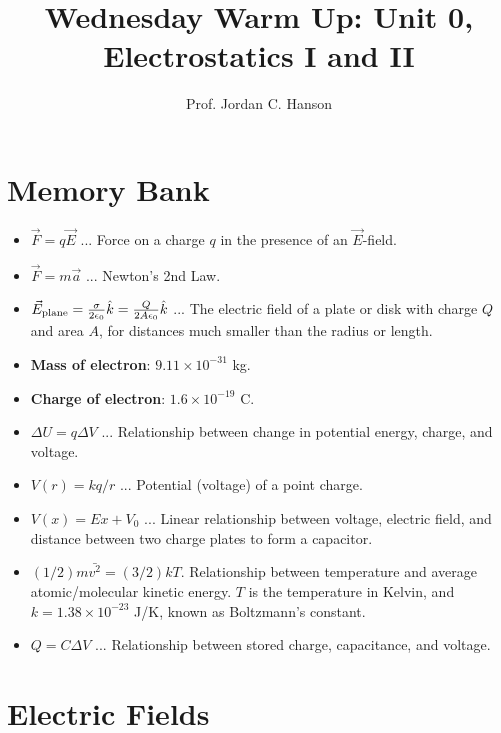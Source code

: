 \documentclass{article}
\begin{document}
\twocolumn

\title{Wednesday Warm Up: Unit 0, Electrostatics I and II}
\author{Prof. Jordan C. Hanson}

\maketitle

\section{Memory Bank}

\begin{itemize}
\item $\vec{F} = q \vec{E}$ ... Force on a charge $q$ in the presence of an $\vec{E}$-field.
\item $\vec{F} = m\vec{a}$ ... Newton's 2nd Law.
\item $\vec{E}_{\rm plane} = \frac{\sigma}{2\epsilon_0}\hat{k} = \frac{Q}{2A\epsilon_0}\hat{k}$ ... The electric field of a plate or disk with charge $Q$ and area $A$, for distances much smaller than the radius or length.
\item \textbf{Mass of electron}: $9.11\times 10^{-31}$ kg.
\item \textbf{Charge of electron}: $1.6\times 10^{-19}$ C.
\item $\Delta U = q\Delta V$ ... Relationship between change in potential energy, charge, and voltage.
\item $V(r) = k q / r$ ... Potential (voltage) of a point charge.
\item $V(x) = E x + V_0$ ... Linear relationship between voltage, electric field, and distance between two charge plates to form a capacitor.
\item $(1/2) m \bar{v^2} = (3/2) k T$.  Relationship between temperature and average atomic/molecular kinetic energy.  $T$ is the temperature in Kelvin, and $k = 1.38 \times 10^{-23}$ J/K, known as Boltzmann's constant.
\item $Q = C\Delta V$ ... Relationship between stored charge, capacitance, and voltage.
\end{itemize}

\section{Electric Fields}
\end{document}
